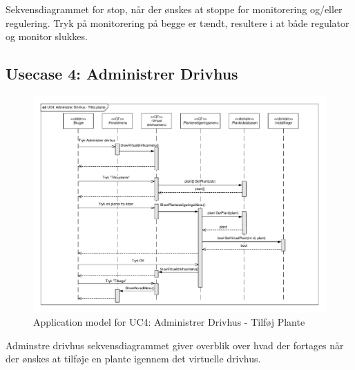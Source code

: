 Sekvensdiagrammet for stop, når der ønskes at stoppe for monitorering og/eller regulering. Tryk på monitorering på begge er tændt, resultere i at både regulator og monitor slukkes.

\clearpage

\subsection{Usecase 4: Administrer Drivhus}

\begin{figure}[!h]
\centering 
\includegraphics[width={\textwidth}, trim=0 0 0 0, clip=true] {../fig/SD_autoGreen_UC_4_Administrerdrivhus.pdf}
\caption{Application model for UC4: Administrer Drivhus - Tilføj Plante}
\label{fig:SD_UC4}
\end{figure}

Adminstre drivhus sekvensdiagrammet giver overblik over hvad der fortages når der ønskes at tilføje en plante igennem det virtuelle drivhus.

\clearpage

